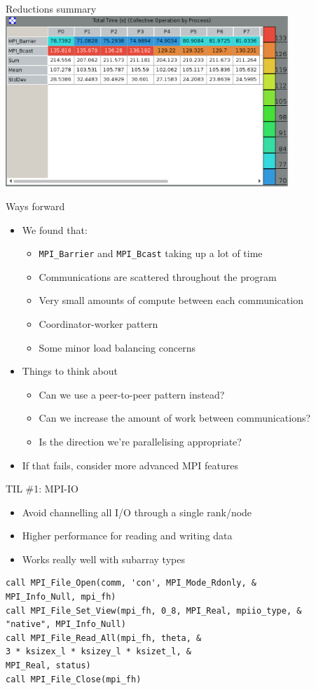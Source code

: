 \documentclass[handout]{beamer}
\begin{document}
\begin{frame}{Reductions summary}
	\centering
	\includegraphics[width=0.8\textwidth]{figs/reductions}
\end{frame}

\begin{frame}[fragile]{Ways forward}
	\begin{itemize}[<+->]
		\item We found that:
		\begin{itemize}[<+->]
			\item \verb|MPI_Barrier| and \verb|MPI_Bcast| taking up a lot of time
			\item Communications are scattered throughout the program
			\item Very small amounts of compute between each communication
			\item Coordinator-worker pattern
			\item Some minor load balancing concerns
		\end{itemize}
		\item Things to think about
		\begin{itemize}[<+->]
			\item Can we use a peer-to-peer pattern instead?
			\item Can we increase the amount of work between communications?
			\item Is the direction we're parallelising appropriate?
		\end{itemize}
		\item If that fails, consider more advanced MPI features
	\end{itemize}
\end{frame}


\begin{frame}[fragile]{TIL \#1: MPI-IO}
	\begin{itemize}[<+->]
		\item Avoid channelling all I/O through a single rank/node
		\item Higher performance for reading and writing data
		\item Works really well with subarray types
	\end{itemize}\pause\small
	\begin{verbatim}
call MPI_File_Open(comm, 'con', MPI_Mode_Rdonly, &
MPI_Info_Null, mpi_fh)
call MPI_File_Set_View(mpi_fh, 0_8, MPI_Real, mpiio_type, &
"native", MPI_Info_Null)
call MPI_File_Read_All(mpi_fh, theta, &
3 * ksizex_l * ksizey_l * ksizet_l, &
MPI_Real, status)
call MPI_File_Close(mpi_fh)\end{verbatim}
\end{frame}
\end{document}
